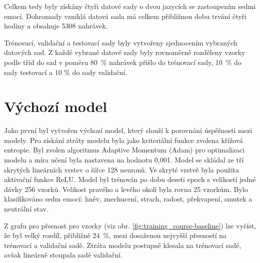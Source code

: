 \documentclass[FM,BP]{tulthesis}
\begin{document}
\begin{table}[ht]
\centering
\caption{Přehled vybraných datových sad}
\label{tab:overview}
\end{table}
\FloatBarrier

Celkem tedy byly získány čtyři datové sady o dvou jazycích se zastoupením sedmi emocí. Dohromady vzniklá datová sada má celkem přibližnou dobu trvání čtyři hodiny a obsahuje 5308 nahrávek.

Trénovací, validační a testovací sady byly vytvořeny sjednocením vybraných datových sad. Z každé vybrané datové sady byly rovnoměrně rozděleny vzorky podle tříd do sad v poměru \mbox{80 \%} nahrávek přišlo do trénovací sady, \mbox{10 \%} do sady testovací a 10 \% do sady validační.

\section{Výchozí model} %
Jako první byl vytvořen výchozí model, který slouží k porovnání úspěšnosti mezi modely. Pro získání ztráty modelu byla jako kriteriální funkce zvolena křížová entropie. Byl zvolen algoritmus Adaptive Momentum (Adam) pro optimalizaci modelu a míra učení byla nastavena na hodnotu 0,001. Model se skládal ze tří skrytých lineárních vrstev o šířce 128 neuronů. Ve skryté vrstvě byla použita aktivační funkce ReLU. Model byl trénován po dobu deseti epoch s velikostí jedné dávky 256 vzorků. Velikost pravého a levého okolí byla rovna 25 vzorkům. Bylo klasifikováno sedm emocí: hněv, znechucení, strach, radost, překvapení, smutek a neutrální stav.

Z grafu pro přesnost pro vzorky (viz obr. \mbox{\ref{fig:training_course-baseline}}) lze vyčíst, že byl velký rozdíl, přibližně \mbox{24 \%}, mezi dosaženou nejvyšší přesností na trénovací a validační sadě. Ztráta modelu postupně klesala na trénovací sadě, avšak lineárně stoupala sadě validační.
\end{document}
